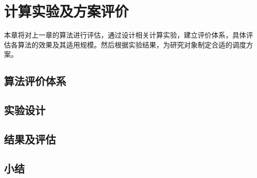 \chapter{计算实验及方案评价}
本章将对上一章的算法进行评估，通过设计相关计算实验，建立评价体系，具体评估各算法的效果及其适用规模。然后根据实验结果，为研究对象制定合适的调度方案。
\section{算法评价体系}

\section{实验设计}

\section{结果及评估}


\section{小结}